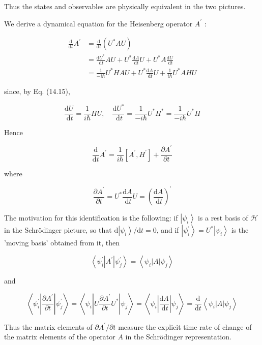 \documentclass[10pt]{article}
\begin{document}
Thus the states and observables are physically equivalent in the two pictures.

We derive a dynamical equation for the Heisenberg operator $A^{\prime}$ :

$$
\begin{aligned}
\frac{\mathrm{d}}{\mathrm{d} t} A^{\prime} & =\frac{\mathrm{d}}{\mathrm{d} t}\left(U^{*} A U\right) \\
& =\frac{\mathrm{d} U^{*}}{\mathrm{~d} t} A U+U^{*} \frac{\mathrm{d} A}{\mathrm{~d} t} U+U^{*} A \frac{\mathrm{d} U}{\mathrm{~d} t} \\
& =\frac{1}{-i \hbar} U^{*} H A U+U^{*} \frac{\mathrm{d} A}{\mathrm{~d} t} U+\frac{1}{i \hbar} U^{*} A H U
\end{aligned}
$$

since, by Eq. (14.15),

$$
\frac{\mathrm{d} U}{\mathrm{~d} t}=\frac{1}{i \hbar} H U, \quad \frac{\mathrm{d} U^{*}}{\mathrm{~d} t}=\frac{1}{-i \hbar} U^{*} H^{*}=\frac{1}{-i \hbar} U^{*} H
$$

Hence

$$
\frac{\mathrm{d}}{\mathrm{d} t} A^{\prime}=\frac{1}{i \hbar}\left[A^{\prime}, H^{\prime}\right]+\frac{\partial A^{\prime}}{\partial t}
$$

where

$$
\frac{\partial A^{\prime}}{\partial t}=U^{*} \frac{\mathrm{d} A}{\mathrm{~d} t} U=\left(\frac{\mathrm{d} A}{\mathrm{~d} t}\right)^{\prime}
$$

The motivation for this identification is the following: if $\left|\psi_{i}\right\rangle$ is a rest basis of $\mathcal{H}$ in the Schrödinger picture, so that $\mathrm{d}\left|\psi_{i}\right\rangle / \mathrm{d} t=0$, and if $\left|\psi_{i}^{\prime}\right\rangle=U^{*}\left|\psi_{i}\right\rangle$ is the 'moving basis' obtained from it, then

$$
\left\langle\psi_{i}^{\prime}\left|A^{\prime}\right| \psi_{j}^{\prime}\right\rangle=\left\langle\psi_{i}|A| \psi_{j}\right\rangle
$$

and

$$
\left\langle\psi_{i}^{\prime}\left|\frac{\partial A^{\prime}}{\partial t}\right| \psi_{j}^{\prime}\right\rangle=\left\langle\psi_{i}\left|U \frac{\partial A^{\prime}}{\partial t} U^{*}\right| \psi_{j}\right\rangle=\left\langle\psi_{i}\left|\frac{\mathrm{d} A}{\mathrm{~d} t}\right| \psi_{j}\right\rangle=\frac{\mathrm{d}}{\mathrm{d} t}\left\langle\psi_{i}|A| \psi_{j}\right\rangle
$$

Thus the matrix elements of $\partial A^{\prime} / \partial t$ measure the explicit time rate of change of the matrix elements of the operator $A$ in the Schrödinger representation.
\end{document}
